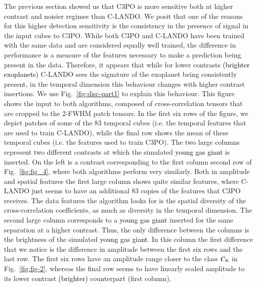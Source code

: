 \documentclass{aa}
\newcommand{\newchange}[1]{\textcolor{black}{#1}}
\begin{document}
The previous section showed us that C3PO is more sensitive both at higher contrast and noisier regimes than C-LANDO.
We posit that one of the reasons for this higher detection sensitivity is the consistency in the presence of signal in the input cubes to C3PO.
While both C3PO and C-LANDO have been trained with the same data and are considered equally well trained, the difference in performance is a measure of the features necessary to make a prediction being present in the data.
Therefore, it appears that while for lower contrasts \newchange{(brighter exoplanets)} C-LANDO sees the signature of the exoplanet being consistently present, in the temporal dimension this behaviour changes with higher contrast insertions.
We use Fig.~\ref{fig:disc-part1} to explain this behaviour.
This figure shows the input to both algorithms, composed of cross-correlation tensors that are cropped to the 2-FWHM patch tensors.
In the first six rows of the figure, we depict patches of some of the $83$ temporal cubes (i.e. the temporal features that are used to train C-LANDO), while the final row shows the mean of these temporal cubes (i.e. the features used to train C3PO).
The two large columns represent two different contrasts at which the simulated \newchange{young gas giant} is inserted. On the left is a contrast corresponding to the first column second row of Fig.~\ref{fig:fig_4}, where both algorithms perform very similarly.
Both in amplitude and spatial features the first large column shows quite similar features, where C-LANDO just seems to have an additional $83$ copies of the features that C3PO receives. 
The data features the algorithm looks for is the spatial diversity of the cross-correlation coefficients, as much as diversity in the temporal dimension.
The second large column corresponds to a \newchange{young gas giant} inserted for the same separation at a higher contrast.
Thus, the only difference between the columns is the brightness of the simulated \newchange{young gas giant}.
In this column the first difference that we notice is the difference in amplitude between the first six rows and the last row.
The first six rows have an amplitude range closer to the class $C_{\rm N}$ in Fig.~\ref{fig:fig-2}, whereas the final row seems to have linearly scaled amplitude to its lower contrast \newchange{(brighter)} counterpart (first column).
\end{document}
